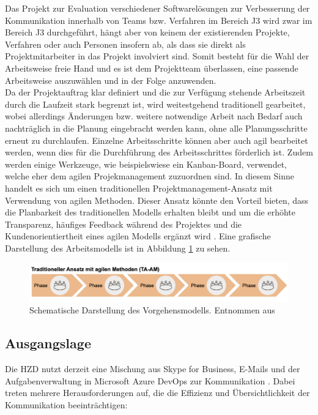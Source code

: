\documentclass[ThesisDJ.tex]{subfiles}
\begin{document}
	Das Projekt zur Evaluation verschiedener Softwarelösungen zur Verbesserung der Kommunikation innerhalb von Teams bzw. Verfahren im Bereich J3 wird zwar im Bereich J3 durchgeführt, hängt aber von keinem der existierenden Projekte, Verfahren oder auch Personen insofern ab, als dass sie direkt als Projektmitarbeiter in das Projekt involviert sind. Somit besteht für die Wahl der Arbeitsweise freie Hand und es ist dem Projektteam überlassen, eine passende Arbeitsweise auszuwählen und in der Folge anzuwenden.\\
	Da der Projektauftrag klar definiert und die zur Verfügung stehende Arbeitszeit durch die Laufzeit stark begrenzt ist, wird weitestgehend traditionell gearbeitet, wobei allerdings Änderungen bzw. weitere notwendige Arbeit nach Bedarf auch nachträglich in die Planung eingebracht werden kann, ohne alle Planungsschritte erneut zu durchlaufen. Einzelne Arbeitsschritte können aber auch agil bearbeitet werden, wenn dies für die Durchführung des Arbeitsschrittes förderlich ist. Zudem werden einige Werkzeuge, wie beispielswiese ein Kanban-Board, verwendet, welche eher dem agilen Projekmanagement zuzuordnen sind. In diesem Sinne handelt es sich um einen 
  traditionellen Projektmanagement-Ansatz mit Verwendung von agilen Methoden. Dieser Ansatz könnte den Vorteil bieten, dass die Planbarkeit des traditionellen Modells erhalten bleibt und um die 
  erhöhte Transparenz, häufiges Feedback während des Projektes und die Kundenorientiertheit eines agilen Modells ergänzt wird \cite[S.~319ff]{dechange_projektmanagement_2024}.
  Eine grafische Darstellung des Arbeitsmodells ist in Abbildung \ref{fig:model} zu sehen.

  \begin{figure}[h!]
    \includegraphics[width=\textwidth]{modell.png}
    \centering
    \caption{Schematische Darstellung des Vorgehensmodells. Entnommen aus \cite[S.~319]{dechange_projektmanagement_2024}}
    \label{fig:model}
  \end{figure}
	
  \subsection{Ausgangslage}
  Die HZD nutzt derzeit eine Mischung aus Skype for Business, E-Mails und der Aufgabenverwaltung in Microsoft Azure DevOps zur Kommunikation \cite{microsoft_azure_nodate}. 
  Dabei treten mehrere Herausforderungen auf, die die Effizienz und Übersichtlichkeit der Kommunikation beeinträchtigen:
\end{document}
